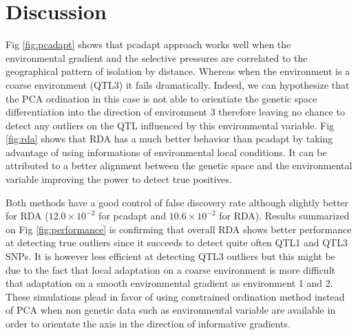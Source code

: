 \documentclass[a4paper,times,10pt,authoryear]{article}%
\begin{document}
\section{Discussion}

Fig \ref{fig:pcadapt} shows that pcadapt approach works well when the environmental gradient and the selective pressures are correlated to the  geographical pattern of isolation by distance. Whereas when the environment is a coarse environment (QTL3) it fails dramatically. Indeed, we can hypothesize that the PCA ordination in this case is not able to orientiate the genetic space differentiation into the direction of environment 3 therefore leaving no chance to detect any outliers on the QTL influenced by this environmental variable. Fig \ref{fig:rda} shows that RDA has a much better behavior than pcadapt by taking advantage of using informations of environmental local conditions. It can be attributed to a better alignment between the genetic space and the environmental variable improving the power to detect true positives.

Both methods have a good control of false discovery rate although slightly better for RDA ($12.0 \times 10^{-2}$ for pcadapt and $10.6 \times 10^{-2}$ for RDA). Results summarized on Fig \ref{fig:performance} is confirming that overall RDA shows better performance at detecting true outliers since it succeeds to detect quite often QTL1 and QTL3 SNPs. It is however less efficient at detecting QTL3 outliers but this might be due to the fact that local adaptation on a coarse environment is more difficult  that adaptation on a smooth environmental gradient as environment 1 and 2. These simulations plead in favor of using constrained ordination method instead of PCA when non genetic data such as environmental variable are available in order to orientate the axis in the direction of informative gradients.
\end{document}
